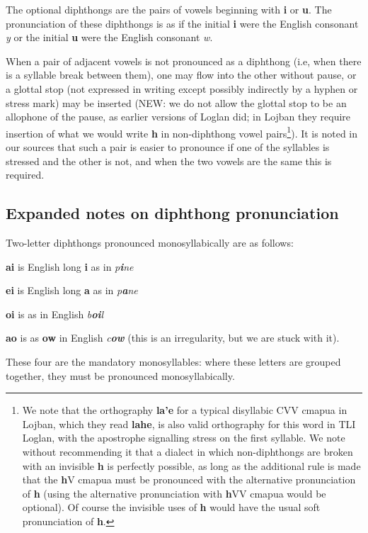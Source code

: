 \documentclass[12pt]{book}
\begin{document}
The optional diphthongs are the pairs of vowels beginning with {\bf i} or {\bf u}.  The pronunciation of these diphthongs is as if the initial {\bf i} were the English consonant {\em y} or the initial {\bf u} were the English consonant {\em w}.   

When a pair of adjacent vowels is not pronounced as a diphthong (i.e, when there is a syllable break between them), one may flow into the other without pause, or a glottal stop (not expressed in writing except possibly indirectly by a hyphen or stress mark)  may be inserted (NEW:  we do not allow the glottal stop to be an allophone of the pause, as earlier versions of Loglan did; in Lojban they require insertion of what we would write {\bf h} in non-diphthong vowel pairs\footnote{We note that the orthography {\bf la'e} for a typical disyllabic CVV cmapua in Lojban, which they read {\bf lahe}, is also valid orthography for this word in TLI Loglan, with the apostrophe signalling stress on the first syllable.  We note without recommending it that a dialect in which non-diphthongs are broken with an invisible {\bf h} is perfectly possible, as long as the additional rule is made that the {\bf h}V cmapua must be pronounced with the alternative pronunciation of {\bf h} (using the alternative pronunciation with {\bf h}VV cmapua would be optional).  Of course the invisible uses of {\bf h} would have the usual soft pronunciation of {\bf h}.}).  It is noted in our sources that such a pair is easier to pronounce if one of the syllables is stressed and the other is not, and when the two vowels are the same this is required.  

\subsection{Expanded notes on diphthong pronunciation}

Two-letter diphthongs pronounced monosyllabically are as follows:

{\bf ai} is English long {\bf i} as in {\em p{\bf i}ne\/}

{\bf ei} is English long {\bf a} as in {\em p{\bf a}ne\/}

{\bf oi} is as in English {\em b{\bf oi}l\/}

{\bf ao} is as {\bf ow} in English {\em c{\bf ow}\/}  (this is an irregularity, but we are stuck with it).

These four are the mandatory monosyllables:  where these letters are grouped together, they must be pronounced monosyllabically.
\end{document}
